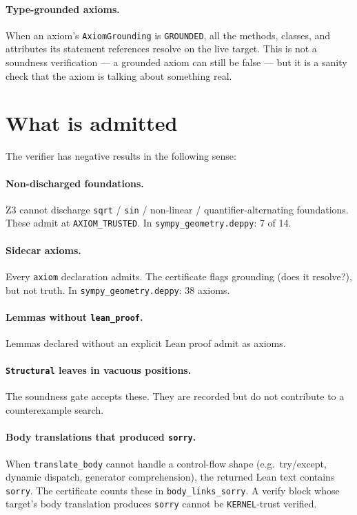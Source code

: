 \paragraph{Type-grounded axioms.}  When an axiom's
\texttt{AxiomGrounding} is \texttt{GROUNDED}, all the methods,
classes, and attributes its statement references resolve on the
live target.  This is not a soundness verification --- a grounded
axiom can still be false --- but it is a sanity check that the
axiom is talking about something real.

\section{What is admitted}

The verifier has negative results in the following sense:

\paragraph{Non-discharged foundations.}  Z3 cannot discharge
\texttt{sqrt} / \texttt{sin} / non-linear / quantifier-alternating
foundations.  These admit at \texttt{AXIOM\_TRUSTED}.  In
\texttt{sympy\_geometry.deppy}: 7 of 14.

\paragraph{Sidecar axioms.}  Every \texttt{axiom} declaration
admits.  The certificate flags grounding (does it resolve?), but
not truth.  In \texttt{sympy\_geometry.deppy}: 38 axioms.

\paragraph{Lemmas without \texttt{lean\_proof}.}  Lemmas declared
without an explicit Lean proof admit as axioms.

\paragraph{\texttt{Structural} leaves in vacuous positions.}  The
soundness gate accepts these.  They are recorded but do not
contribute to a counterexample search.

\paragraph{Body translations that produced \texttt{sorry}.}  When
\texttt{translate\_body} cannot handle a control-flow shape
(e.g.\ try/except, dynamic dispatch, generator comprehension), the
returned Lean text contains \texttt{sorry}.  The certificate
counts these in \texttt{body\_links\_sorry}.  A verify block whose
target's body translation produces \texttt{sorry} cannot be
\texttt{KERNEL}-trust verified.

